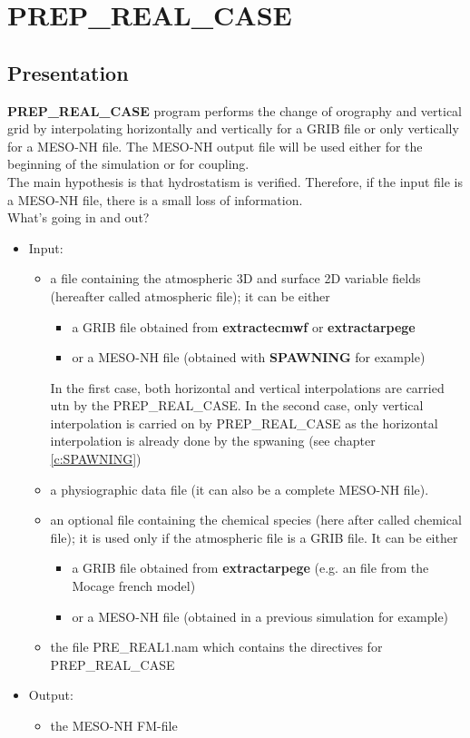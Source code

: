 \chapter{{\bf PREP\_REAL\_CASE}}\label{c:PREPREAL}
\section{Presentation}
{\bf PREP\_REAL\_CASE } program performs the change of
orography and vertical grid by interpolating horizontally and vertically for a 
GRIB file or only vertically for a MESO-NH file. The MESO-NH output file  will
 be used either for the beginning of the simulation or for coupling.\\
The main hypothesis is that hydrostatism is verified.
Therefore, if the input file is a MESO-NH file, there is a small 
loss of information.\\

What's going in and out?
\begin{itemize}
\item Input:
\begin{itemize}
\item a file containing the atmospheric 3D and surface 2D variable fields
(hereafter called atmospheric file); it can be
either
\begin{itemize}
\item a GRIB file obtained from {\bf extractecmwf} or {\bf extractarpege}
\item or a MESO-NH file (obtained with {\bf SPAWNING} for example)
\end{itemize}
In the first case, both horizontal and vertical interpolations are carried
 utn by the PREP\_REAL\_CASE. In the second case, only vertical interpolation is 
carried on by PREP\_REAL\_CASE  as the horizontal interpolation is already 
done by the spwaning (see chapter \ref{c:SPAWNING})
\item a physiographic data file (it can also be a complete MESO-NH file).
\item an optional file containing the chemical species (here after called
chemical file); it is used only if the atmospheric file is a GRIB file. 
It can be either
\begin{itemize}
\item a GRIB file obtained from {\bf extractarpege} (e.g. an file from the
Mocage french model)
\item or a MESO-NH file (obtained in a previous simulation for example)
\end{itemize}
\item the file PRE\_REAL1.nam which contains the directives for PREP\_REAL\_CASE
\end{itemize}
\item Output:
\begin{itemize}
\item the MESO-NH FM-file
\end{itemize}
\end{itemize}


